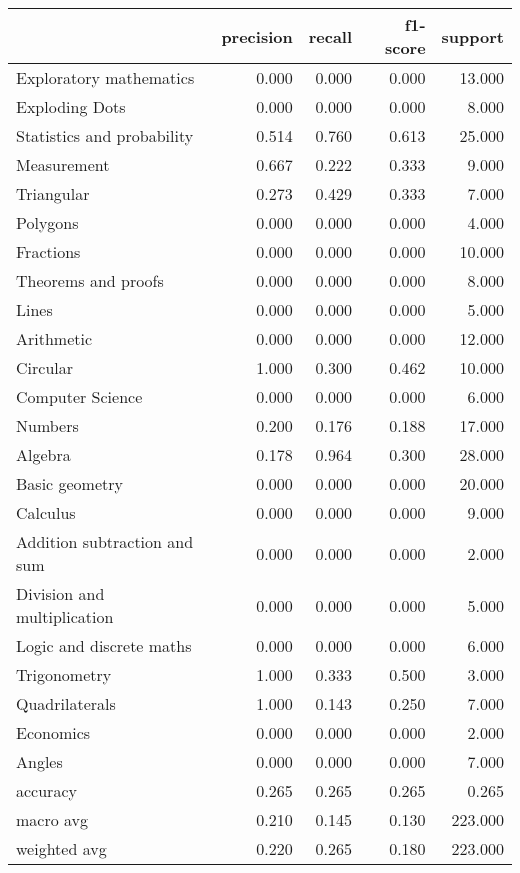 \begin{tabular}{lrrrr}
\toprule
{} &  precision &  recall &  f1-score &  support \\
\midrule
Exploratory mathematics      &      0.000 &   0.000 &     0.000 &   13.000 \\
Exploding Dots               &      0.000 &   0.000 &     0.000 &    8.000 \\
Statistics and probability   &      0.514 &   0.760 &     0.613 &   25.000 \\
Measurement                  &      0.667 &   0.222 &     0.333 &    9.000 \\
Triangular                   &      0.273 &   0.429 &     0.333 &    7.000 \\
Polygons                     &      0.000 &   0.000 &     0.000 &    4.000 \\
Fractions                    &      0.000 &   0.000 &     0.000 &   10.000 \\
Theorems and proofs          &      0.000 &   0.000 &     0.000 &    8.000 \\
Lines                        &      0.000 &   0.000 &     0.000 &    5.000 \\
Arithmetic                   &      0.000 &   0.000 &     0.000 &   12.000 \\
Circular                     &      1.000 &   0.300 &     0.462 &   10.000 \\
Computer Science             &      0.000 &   0.000 &     0.000 &    6.000 \\
Numbers                      &      0.200 &   0.176 &     0.188 &   17.000 \\
Algebra                      &      0.178 &   0.964 &     0.300 &   28.000 \\
Basic geometry               &      0.000 &   0.000 &     0.000 &   20.000 \\
Calculus                     &      0.000 &   0.000 &     0.000 &    9.000 \\
Addition subtraction and sum &      0.000 &   0.000 &     0.000 &    2.000 \\
Division and multiplication  &      0.000 &   0.000 &     0.000 &    5.000 \\
Logic and discrete maths     &      0.000 &   0.000 &     0.000 &    6.000 \\
Trigonometry                 &      1.000 &   0.333 &     0.500 &    3.000 \\
Quadrilaterals               &      1.000 &   0.143 &     0.250 &    7.000 \\
Economics                    &      0.000 &   0.000 &     0.000 &    2.000 \\
Angles                       &      0.000 &   0.000 &     0.000 &    7.000 \\
accuracy                     &      0.265 &   0.265 &     0.265 &    0.265 \\
macro avg                    &      0.210 &   0.145 &     0.130 &  223.000 \\
weighted avg                 &      0.220 &   0.265 &     0.180 &  223.000 \\
\bottomrule
\end{tabular}
